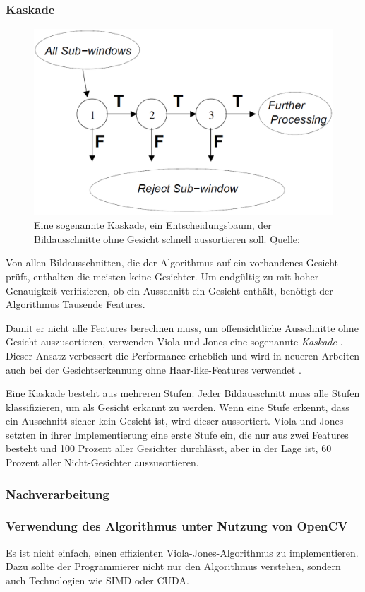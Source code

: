 \documentclass[doktyp=semarbeit, sprache=german]{TUBAFarbeiten}
\begin{document}
\subsubsection{Kaskade}
\begin{figure}
	\centering
	\includegraphics[width=0.7\linewidth]{images/cascade}
	\caption[Kaskade]{Eine sogenannte Kaskade, ein Entscheidungsbaum, der Bildausschnitte ohne Gesicht schnell aussortieren soll. Quelle: \cite{Viola01rapidobject}}
	\label{fig:cascade}
\end{figure}


Von allen Bildausschnitten, die der Algorithmus auf ein vorhandenes Gesicht prüft, enthalten die meisten keine Gesichter. Um endgültig zu mit hoher Genauigkeit verifizieren, ob ein Ausschnitt ein Gesicht enthält, benötigt der Algorithmus Tausende Features.

Damit er nicht alle Features berechnen muss, um offensichtliche Ausschnitte ohne Gesicht auszusortieren, verwenden Viola und Jones eine sogenannte \textit{Kaskade} \cite{Viola01rapidobject}. Dieser Ansatz verbessert die Performance erheblich und wird in neueren Arbeiten auch bei der Gesichtserkennung ohne Haar-like-Features verwendet \cite{Li_2015_CVPR}.

Eine Kaskade besteht aus mehreren Stufen: Jeder Bildausschnitt muss alle Stufen klassifizieren, um als Gesicht erkannt zu werden. Wenn eine Stufe erkennt, dass ein Ausschnitt sicher kein Gesicht ist, wird dieser aussortiert. Viola und Jones setzten in ihrer Implementierung eine erste Stufe ein, die nur aus zwei Features besteht und 100 Prozent aller Gesichter durchlässt, aber in der Lage ist, 60 Prozent aller Nicht-Gesichter auszusortieren.

\subsubsection{Nachverarbeitung}

\subsubsection{Verwendung des Algorithmus unter Nutzung von OpenCV}
Es ist nicht einfach, einen effizienten Viola-Jones-Algorithmus zu implementieren. Dazu sollte der Programmierer nicht nur den Algorithmus verstehen, sondern auch Technologien wie SIMD oder CUDA. 
\end{document}
